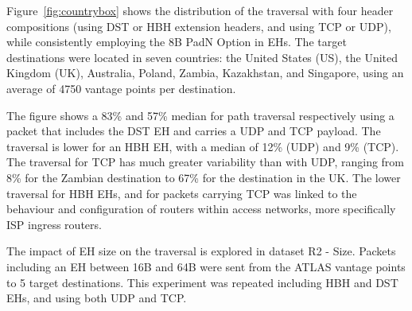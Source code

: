 \documentclass[conference]{IEEEtran}
\begin{document}

Figure~\ref{fig:countrybox} shows the distribution of the traversal with
four header compositions (using DST or HBH extension headers, and
using TCP or UDP), while consistently employing the 8B PadN Option in EHs.  The target
destinations were located in seven countries: the United States (US), the
United Kingdom (UK), Australia, Poland, Zambia, Kazakhstan, and Singapore, using
an average of 4750 vantage points per destination.

The figure shows a 83\% and 57\% median for path traversal 
respectively using a packet that includes the
DST EH and carries a UDP and TCP payload.  The traversal is lower
for an HBH EH, with a median of 12\% (UDP) and 9\% (TCP). The traversal
 for TCP has much greater variability than with
UDP, ranging from 8\% for the Zambian destination to 67\% for the destination in the
UK. The lower traversal for HBH EHs, and for packets carrying TCP
was  linked to the
behaviour and configuration of routers within access networks, more
specifically ISP ingress routers.

The impact of EH size on the traversal is explored in dataset R2 - Size. Packets including an EH between 16B and 64B were sent from the ATLAS vantage points to 5 target destinations.  This experiment was repeated including
HBH and DST EHs, and using both UDP and TCP. 

\end{document}
